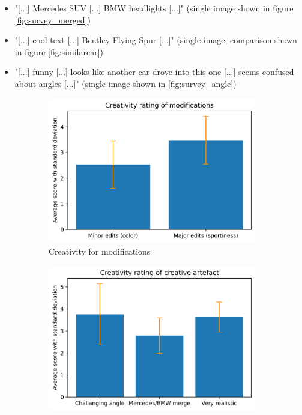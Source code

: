 \begin{itemize}
\begin{itemize}
        \item "[...] Mercedes SUV [...] BMW headlights [...]" (single image shown in figure \ref{fig:survey_merged})
        \item "[...] cool text [...] Bentley Flying Spur [...]" (single image, comparison shown in figure \ref{fig:similarcar})
        \item "[...] funny [...] looks like another car drove into this one [...] seems confused about angles [...]" (single image shown in \ref{fig:survey_angle})
    \end{itemize}
\end{itemize}


\begin{figure}
\centering
\begin{subfigure}{.45\textwidth}
  \centering
  \includegraphics[width=\textwidth]{images/creativity_minor_changes.png}
  \caption{Creativity for modifications}
  \label{fig:creative_minor_changes}
\end{subfigure}%
\hspace{.02\textwidth}
\begin{subfigure}{.45\textwidth}
  \centering
  \includegraphics[width=\textwidth]{images/single_images_creativity.png}

\end{subfigure}
\end{figure}
